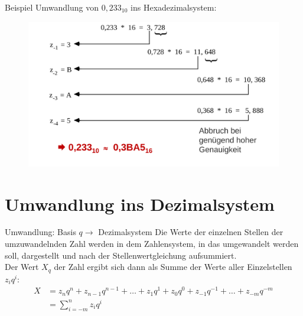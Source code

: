 \documentclass[12pt%
,aspectratio=169%
]{beamer}
\begin{document}
\begin{frame}{Beispiel}
Umwandlung von $0,233_{10}$ ins Hexadezimalsystem:
\begin{figure}
\center
\includegraphics[scale=0.3]{pictures/horner2.png}
\end{figure}
\end{frame}

\section{Umwandlung ins Dezimalsystem}

\begin{frame}{Umwandlung: Basis $q \to$ Dezimalsystem}
Die Werte der einzelnen Stellen der umzuwandelnden Zahl werden in dem Zahlensystem, in das umgewandelt werden soll, dargestellt und nach der Stellenwertgleichung aufsummiert.\\
Der Wert $X_q$ der Zahl ergibt sich dann als Summe der Werte aller Einzelstellen $z_i q^i$:
\begin{align*}
	X &= z_n q^n + z_{n -1} q^{n - 1} + \ldots + z_1 q^1 + z_0 q^0 + z_{-1} q^{-1} + \ldots + z_{-m} q^{-m}\\ 		&= \sum_{i=-m}^n z_i q^i
\end{align*}
\end{frame}
\end{document}

